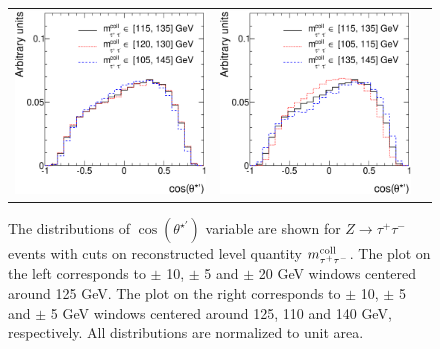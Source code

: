 \documentclass[12pt]{article}
\begin{document}
\begin{figure}[htp!]
\begin{tabular}{ccc}
\includegraphics[width=0.48\columnwidth]{Ztautau_8TeV_cstarp_cuts_cutsa_cutsb.eps} & 
\includegraphics[width=0.48\columnwidth]{Ztautau_8TeV_cstarp_cuts_cutslo_cutshi.eps} 
\end{tabular}
\caption{The distributions of $\cos(\theta^{\star\prime})$ variable are shown for $Z\to\tau^+\tau^-$ events with cuts on reconstructed level quantity $m^{\rm{coll}}_{\tau^+\tau^-}$.
The plot on the left corresponds to $\pm$ 10, $\pm$ 5 and $\pm$ 20 GeV windows centered around 125 GeV.
The plot on the right corresponds to $\pm$ 10, $\pm$ 5 and $\pm$ 5 GeV windows centered around 125, 110 and 140 GeV, respectively.
All distributions are normalized to unit area.
}
\label{Cstarprime_cuts_Z}
\end{figure}
\end{document}
